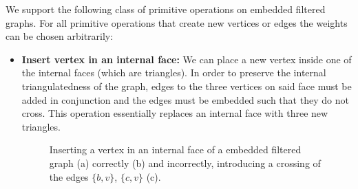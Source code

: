 We support the following class of primitive operations on embedded filtered graphs. For all primitive operations that create new vertices or edges the weights can be chosen arbitrarily:
%
\begin{itemize}
	\item \textbf{Insert vertex in an internal face:} We can place a new vertex inside one of the internal faces (which are triangles). In order to preserve the internal triangulatedness of the graph, edges to the three vertices on said face must be added in conjunction and the edges must be embedded such that they do not cross. This operation essentially replaces an internal face with three new triangles.
\begin{figure}[H]
	\centering
	\quad
	\quad
	\caption{Inserting a vertex in an internal face of a embedded filtered graph (a) correctly (b) and incorrectly, introducing a crossing of the edges $\{b,v\}$, $\{c,v\}$ (c).}
	\label{fig:transformation}
\end{figure}


\end{itemize}

